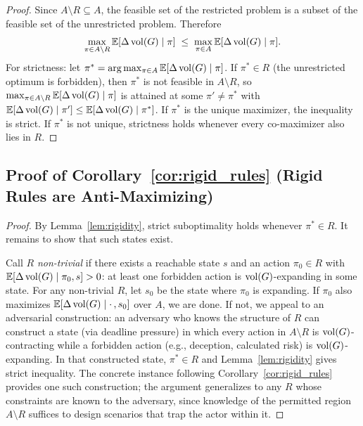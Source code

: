 \begin{proof}
Since $A \setminus R \subseteq A$, the feasible set of the restricted problem
is a subset of the feasible set of the unrestricted problem. Therefore
\[
\max_{\pi \in A \setminus R} \mathbb{E}[\Delta \operatorname{vol}(G) \mid \pi]
\;\leq\; \max_{\pi \in A} \mathbb{E}[\Delta \operatorname{vol}(G) \mid \pi].
\]
For strictness: let $\pi^* = \arg\max_{\pi \in A} \mathbb{E}[\Delta \operatorname{vol}(G)
\mid \pi]$. If $\pi^* \in R$ (the unrestricted optimum is forbidden), then
$\pi^*$ is not feasible in $A \setminus R$, so
$\max_{\pi \in A \setminus R} \mathbb{E}[\Delta \operatorname{vol}(G) \mid \pi]$ is attained
at some $\pi' \neq \pi^*$ with
$\mathbb{E}[\Delta \operatorname{vol}(G) \mid \pi'] \leq \mathbb{E}[\Delta \operatorname{vol}(G) \mid
\pi^*]$. If $\pi^*$ is the unique maximizer, the inequality is strict. If
$\pi^*$ is not unique, strictness holds whenever every co-maximizer also
lies in $R$.
\end{proof}


\subsection{Proof of Corollary~\ref{cor:rigid_rules} (Rigid Rules are Anti-Maximizing)}
\label{app:proof_rigid_rules}

\begin{proof}
By Lemma~\ref{lem:rigidity}, strict suboptimality holds whenever
$\pi^* \in R$. It remains to show that such states exist.

Call $R$ \emph{non-trivial} if there exists a reachable state $s$ and an
action $\pi_0 \in R$ with $\mathbb{E}[\Delta \operatorname{vol}(G) \mid \pi_0, s] > 0$:
at least one forbidden action is $\operatorname{vol}(G)$-expanding in some state. For any
non-trivial $R$, let $s_0$ be the state where $\pi_0$ is expanding. If
$\pi_0$ also maximizes $\mathbb{E}[\Delta \operatorname{vol}(G) \mid \cdot\,, s_0]$ over
$A$, we are done. If not, we appeal to an adversarial construction: an adversary who knows the
structure of $R$ can construct a state (via deadline pressure) in which every
action in $A \setminus R$ is $\operatorname{vol}(G)$-contracting while a forbidden action
(e.g., deception, calculated risk) is $\operatorname{vol}(G)$-expanding. In that constructed
state, $\pi^* \in R$ and Lemma~\ref{lem:rigidity} gives strict inequality.
The concrete instance following Corollary~\ref{cor:rigid_rules} provides one
such construction; the argument generalizes to any $R$ whose constraints are
known to the adversary, since knowledge of the permitted region $A \setminus R$
suffices to design scenarios that trap the actor within it.
\end{proof}

